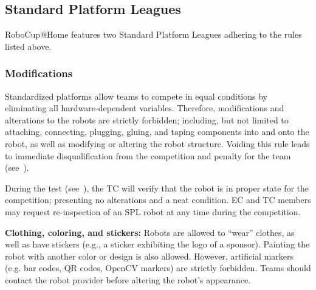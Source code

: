 \subsection{Standard Platform Leagues}
RoboCup@Home features two Standard Platform Leagues adhering to the rules listed above.

\subsubsection{Modifications}
\label{rule:spl-mods}
Standardized platforms allow teams to compete in equal conditions by eliminating all hardware-dependent variables.
Therefore, modifications and alterations to the robots are strictly forbidden; including, but not limited to attaching, connecting, plugging, gluing, and taping components into and onto the robot, as well as modifying or altering the robot structure.
Voiding this rule leads to immediate disqualification from the competition and penalty for the team (see~).

During the  test (see~), the TC will verify that the robot is in proper state for the competition; presenting no alterations and a neat condition.
EC and TC members may request re-inspection of an SPL robot at any time during the competition.

\textbf{Clothing, coloring, and stickers:} Robots are allowed to \enquote{wear} clothes, as well as have stickers (e.g., a sticker exhibiting the logo of a sponsor).
Painting the robot with another color or design is also allowed. 
However, artificial markers (e.g. bar codes, QR codes, OpenCV markers) are strictly forbidden. 
Teams should contact the robot provider before altering the robot's appearance.


